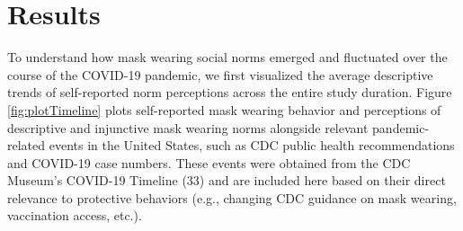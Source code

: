 \documentclass[
  man,floatsintext]{apa6}
\begin{document}
\hypertarget{results}{%
\section{Results}\label{results}}

To understand how mask wearing social norms emerged and fluctuated over the course of the COVID-19 pandemic, we first visualized the average descriptive trends of self-reported norm perceptions across the entire study duration. Figure \ref{fig:plotTimeline} plots self-reported mask wearing behavior and perceptions of descriptive and injunctive mask wearing norms alongside relevant pandemic-related events in the United States, such as CDC public health recommendations and COVID-19 case numbers. These events were obtained from the CDC Museum's COVID-19 Timeline (33) and are included here based on their direct relevance to protective behaviors (e.g., changing CDC guidance on mask wearing, vaccination access, etc.).
\end{document}

